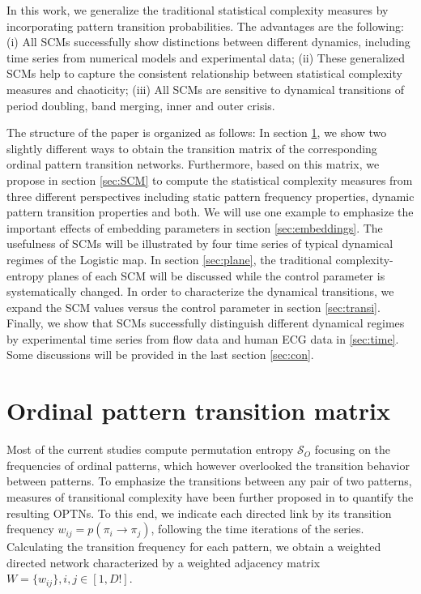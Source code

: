 \documentclass[12pt,aip,cha,reprint,nofootinbib]{revtex4-1}
\begin{document}
In this work, we generalize the traditional statistical complexity measures by incorporating pattern transition probabilities. The advantages are the following: (i) All SCMs successfully show distinctions between different dynamics, including time series from numerical models and experimental data; (ii) These generalized SCMs help to capture the consistent relationship between statistical complexity measures and chaoticity; (iii) All SCMs are sensitive to dynamical transitions of period doubling, band merging, inner and outer crisis. 

The structure of the paper is organized as follows: In section \ref{sec:OPW}, we show two slightly different ways to obtain the transition matrix of the corresponding ordinal pattern transition networks. Furthermore, based on this matrix, we propose in section \ref{sec:SCM} to compute the statistical complexity measures from three different perspectives including static pattern frequency properties, dynamic pattern transition properties and both. We will use one example to emphasize the important effects of embedding parameters in section \ref{sec:embeddings}. The usefulness of SCMs will be illustrated by four time series of typical dynamical regimes of the Logistic map. In section \ref{sec:plane}, the traditional complexity-entropy planes of each SCM will be discussed while the control parameter is systematically changed. In order to characterize the dynamical transitions, we expand the SCM values versus the control parameter in section \ref{sec:transi}. Finally, we show that SCMs successfully distinguish different dynamical regimes by experimental time series from flow data and human ECG data in \ref{sec:time}. Some discussions will be provided in the last section \ref{sec:con}.  

\section{Ordinal pattern transition matrix} \label{sec:OPW}
Most of the current studies compute permutation entropy $\mathcal{S}_O$ focusing on the frequencies of ordinal patterns, which however overlooked the transition behavior between  patterns. To emphasize the transitions between any pair of two patterns, measures of transitional complexity have been further proposed in \cite{zhangSciRep2017,McCullough2017b} to quantify the resulting OPTNs. To this end, we indicate each directed link by its transition frequency $w_{ij} = p({\pi_i \to \pi_j})$, following the time iterations of the series. Calculating the transition frequency for each pattern, we obtain a weighted directed network characterized by a weighted adjacency matrix $W = \{ w_{ij} \}, i, j \in [1, D!]$. 
\end{document}
